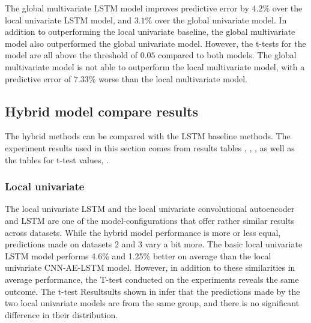The global multivariate LSTM model improves predictive error by $4.2\%$ over the local univariate LSTM model,
and $3.1\%$ over the global univariate model.
In addition to outperforming the local univariate baseline, the global multivariate model also outperformed the global univariate model.
However, the t-tests for the model are all above the threshold of $0.05$ compared to both models.
The global multivariate model is not able to outperform the local multivariate model,
with a predictive error of $7.33\%$ worse than the local multivariate model.






\subsection{Hybrid model compare results}
\label{section:discussion&results:experiment-results:CNN-AE-LSTM}
The hybrid methods can be compared with the LSTM baseline methods.
The experiment results used in this section comes from results tables
, , ,
as well as the tables for t-test values, .


\subsubsection{Local univariate}
\label{section:discussion&results:experiment-results:CNN-AE-LSTM:Local-Univariate}
The local univariate LSTM and the local univariate convolutional autoencoder and LSTM are one of the model-configurations
that offer rather similar results across datasets.
While the hybrid model performance is more or less equal, predictions made on datasets 2 and 3 vary a bit more.
The basic local univariate LSTM model performs 4.6\% and 1.25\% better on average than the local univariate CNN-AE-LSTM model.
However, in addition to these similarities in average performance, the T-test conducted on the experiments reveals the same outcome.
The t-test Resultsults shown in  infer that the predictions made by the two local univariate models
are from the same group, and there is no significant difference in their distribution.



